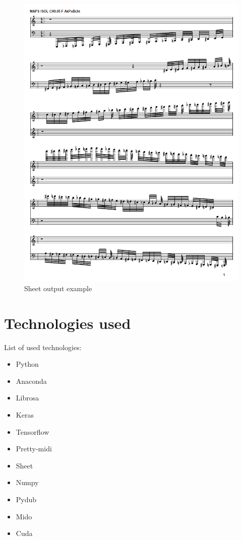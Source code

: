 \begin{figure}[H]
	\caption[Sheet output example]{ Sheet output example }
	\centering
	\label{fig:sheet_output}
	\includegraphics[width=1\textwidth, height=\textheight, keepaspectratio]{"resources/sheet_example"}
\end{figure}

\section{Technologies used}
List of used technologies:
\begin{itemize}
	\item Python~\cite{python}
	\item Anaconda~\cite{anaconda}
	\item Librosa~\cite{librosa}
	\item Keras~\cite{keras}
	\item Tensorflow~\cite{tensorflow}
	\item Pretty-midi~\cite{pretty_midi}
	\item Sheet~\cite{sheet}
	\item Numpy~\cite{numpy}
	\item Pydub~\cite{pydub}
	\item Mido~\cite{mido}
	\item Cuda~\cite{cuda}
	
\end{itemize}